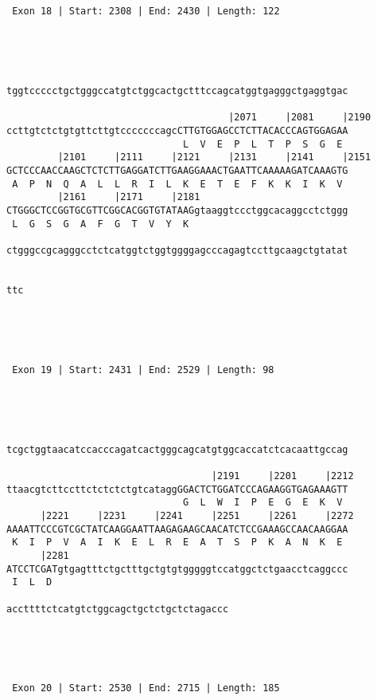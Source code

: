 \documentclass{article}
\begin{document}
\begin{Verbatim}
 Exon 18 | Start: 2308 | End: 2430 | Length: 122 




                                                            
tggtccccctgctgggccatgtctggcactgctttccagcatggtgagggctgaggtgac
                                                            
                                       |2071     |2081     |2190
ccttgtctctgtgttcttgtcccccccagcCTTGTGGAGCCTCTTACACCCAGTGGAGAA
                               L  V  E  P  L  T  P  S  G  E 
         |2101     |2111     |2121     |2131     |2141     |2151
GCTCCCAACCAAGCTCTCTTGAGGATCTTGAAGGAAACTGAATTCAAAAAGATCAAAGTG
 A  P  N  Q  A  L  L  R  I  L  K  E  T  E  F  K  K  I  K  V 
         |2161     |2171     |2181                          
CTGGGCTCCGGTGCGTTCGGCACGGTGTATAAGgtaaggtccctggcacaggcctctggg
 L  G  S  G  A  F  G  T  V  Y  K                            
                                                            
ctgggccgcagggcctctcatggtctggtggggagcccagagtccttgcaagctgtatat
                                                            
   
ttc
   




 Exon 19 | Start: 2431 | End: 2529 | Length: 98 




                                                            
tcgctggtaacatccacccagatcactgggcagcatgtggcaccatctcacaattgccag
                                                            
                                    |2191     |2201     |2212
ttaacgtcttccttctctctctgtcataggGGACTCTGGATCCCAGAAGGTGAGAAAGTT
                               G  L  W  I  P  E  G  E  K  V 
      |2221     |2231     |2241     |2251     |2261     |2272
AAAATTCCCGTCGCTATCAAGGAATTAAGAGAAGCAACATCTCCGAAAGCCAACAAGGAA
 K  I  P  V  A  I  K  E  L  R  E  A  T  S  P  K  A  N  K  E 
      |2281                                                 
ATCCTCGATgtgagtttctgctttgctgtgtgggggtccatggctctgaacctcaggccc
 I  L  D                                                    
                                       
accttttctcatgtctggcagctgctctgctctagaccc
                                       




 Exon 20 | Start: 2530 | End: 2715 | Length: 185 





\end{Verbatim}
\end{document}
